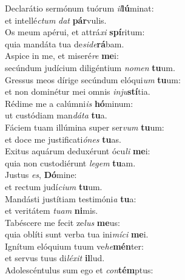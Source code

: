 \evenverse Declarátio sermónum tuórum \textit{il}\textbf{lú}minat:~\*\\
\evenverse et intellé\textit{ctum} \textit{dat} \textbf{pár}vulis.\\
\oddverse Os meum apérui, et attrá\textit{xi} \textbf{spí}ritum:~\*\\
\oddverse quia mandáta tua de\textit{si}\textit{de}\textbf{rá}bam.\\
\evenverse Aspice in me, et miseré\textit{re} \textbf{me}i:~\*\\
\evenverse secúndum judícium diligéntium \textit{no}\textit{men} \textbf{tu}um.\\
\oddverse Gressus meos dírige secúndum elóqui\textit{um} \textbf{tu}um:~\*\\
\oddverse et non dominétur mei omnis \textit{in}\textit{ju}\textbf{stí}tia.\\
\evenverse Rédime me a calúmni\textit{is} \textbf{hó}minum:~\*\\
\evenverse ut custódiam man\textit{dá}\textit{ta} \textbf{tu}a.\\
\oddverse Fáciem tuam illúmina super ser\textit{vum} \textbf{tu}um:~\*\\
\oddverse et doce me justificati\textit{ó}\textit{nes} \textbf{tu}as.\\
\evenverse Exitus aquárum deduxérunt ócu\textit{li} \textbf{me}i:~\*\\
\evenverse quia non custodiérunt \textit{le}\textit{gem} \textbf{tu}am.\\
\oddverse Justus \textit{es}, \textbf{Dó}mine:~\*\\
\oddverse et rectum judí\textit{ci}\textit{um} \textbf{tu}um.\\
\evenverse Mandásti justítiam testimóni\textit{a} \textbf{tu}a:~\*\\
\evenverse et veritátem \textit{tu}\textit{am} \textbf{ni}mis.\\
\oddverse Tabéscere me fecit ze\textit{lus} \textbf{me}us:~\*\\
\oddverse quia oblíti sunt verba tua ini\textit{mí}\textit{ci} \textbf{me}i.\\
\evenverse Ignítum elóquium tuum ve\textit{he}\textbf{mén}ter:~\*\\
\evenverse et servus tuus di\textit{lé}\textit{xit} \textbf{il}lud.\\
\oddverse Adolescéntulus sum ego et \textit{con}\textbf{tém}ptus:~\*\\
